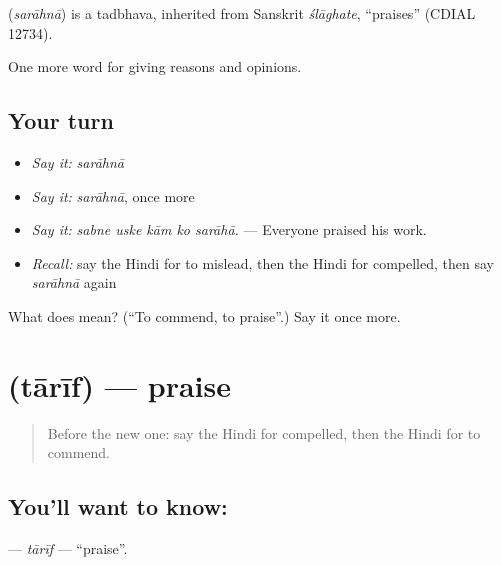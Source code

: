 \begin{cousinweb}
\textbf{} (\emph{sarāhnā}) is a tadbhava, inherited from Sanskrit \emph{ślāghate}, \textquotedblleft{}praises\textquotedblright{} (CDIAL 12734).
\end{cousinweb}

\begin{grammarlens}[title={What you've built}]
One more word for giving reasons and opinions.
\end{grammarlens}

\subsection*{Your turn}
\begin{itemize}
\raggedright
  \item \emph{Say it:} \emph{sarāhnā}
  \item \emph{Say it:} \emph{sarāhnā}, once more
  \item \emph{Say it:} \emph{sabne uske kām ko sarāhā.} — Everyone praised his work.
  \item \emph{Recall:} say the Hindi for to mislead, then the Hindi for compelled, then say \emph{sarāhnā} again
\end{itemize}

\begin{tcolorbox}[breakable,colback=teal!4,colframe=teal!35!black,title={Before you move on}]
What does  mean? (\textquotedblleft{}To commend, to praise\textquotedblright{}.) Say it once more.
\end{tcolorbox}
\section[\texorpdfstring{\hi{तारीफ़} (tārīf)}{तारीफ़ (tārīf)}]{ (tārīf) — praise}

\label{lesson:HI-C367-tarif}



\begin{quote}
Before the new one: say the Hindi for compelled, then the Hindi for to commend.
\end{quote}

\subsection*{You'll want to know: }
\textbf{} — \emph{tārīf} — \textquotedblleft{}praise\textquotedblright{}.


